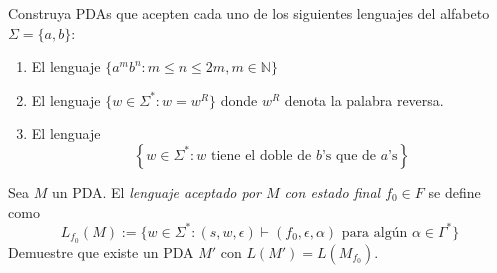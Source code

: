 \documentclass[12pt, a4paper]{article}
\begin{document}
\item Construya PDAs que acepten cada uno de los siguientes lenguajes del alfabeto $\Sigma=\{a,b\}$:
\begin{enumerate}
\item El lenguaje $\{a^mb^n: m\leq n\leq 2m, m\in \mathbb{N}\}$
\item El lenguaje $\{w\in \Sigma^*: w=w^R\}$ donde $w^R$ denota la palabra reversa.
\item El lenguaje 
\[\left\{w\in \Sigma^*:\text{$w$ tiene el doble de $b$'s que de $a$'s}\right\}\]
\end{enumerate}

\item Sea $M$ un PDA. El \emph{lenguaje aceptado por $M$ con estado final $f_0\in F$} se define como
\[L_{f_0}(M):=\{w\in \Sigma^*: (s,w,\epsilon)\vdash (f_0,\epsilon,\alpha)\text{ para algún $\alpha\in \Gamma^*$}\}\]
Demuestre que existe un PDA $M'$ con $L(M')=L(M_{f_0})$.
\end{document}

